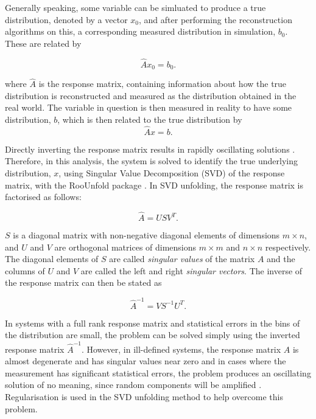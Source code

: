 Generally speaking, some variable can be simluated to produce a true distribution, denoted by a vector
$x_{0}$, and after performing the reconstruction algorithms on this, a corresponding measured distribution in
simulation, $b_{0}$. These are related by

\begin{equation}
\label{eq:unfolding_MC}
\hat{A} x_0 = b_0.
\end{equation}

where $\hat{A}$ is the response matrix, containing information about how the true distribution is
reconstructed and measured as the distribution obtained in the real world. The variable in question is then
measured in reality to have some distribution, $b$, which is then related to the true distribution by
\begin{equation}
\label{eq:unfolding_data}
\hat{A} x = b.
\end{equation}

Directly inverting the response matrix results in rapidly oscillating solutions \cite{Hocker:1995kb}.
Therefore, in this analysis, the system is solved to identify the true underlying distribution, $x$, using
Singular Value Decomposition (SVD) \cite{Hocker:1995kb} of the response matrix, with the RooUnfold package
\cite{Adye:2011gm}. In SVD unfolding, the response matrix is factorised as follows:

\begin{equation}
\hat{A} = USV^{T}.
\label{eq:response}
\end{equation}

$S$ is a diagonal matrix with non-negative diagonal elements of dimensions $m \times n$, and $U$ and $V$ are
orthogonal matrices of dimensions $m \times m$ and $n \times n$ respectively. The diagonal elements of $S$ are
called \textit{singular values} of the matrix $A$ and the columns of $U$ and $V$ are called the left and right
\textit{singular vectors}. The inverse of the response matrix can then be stated as

\begin{equation}
\hat{A}^{-1} = VS^{-1}U^{T}.
\label{eq:inverse_response}
\end{equation}

In systems with a full rank response matrix and statistical errors in the bins of the distribution are small,
the problem can be solved simply using the inverted response matrix $\hat{A}^{-1}$. However, in ill-defined
systems, the response matrix $A$ is almost degenerate and has singular values near zero and in cases where the
measurement has significant statistical errors, the problem produces an oscillating solution of no meaning,
since random components will be amplified \cite{Hocker:1995kb}. Regularisation is used in the SVD
unfolding method to help overcome this problem.


